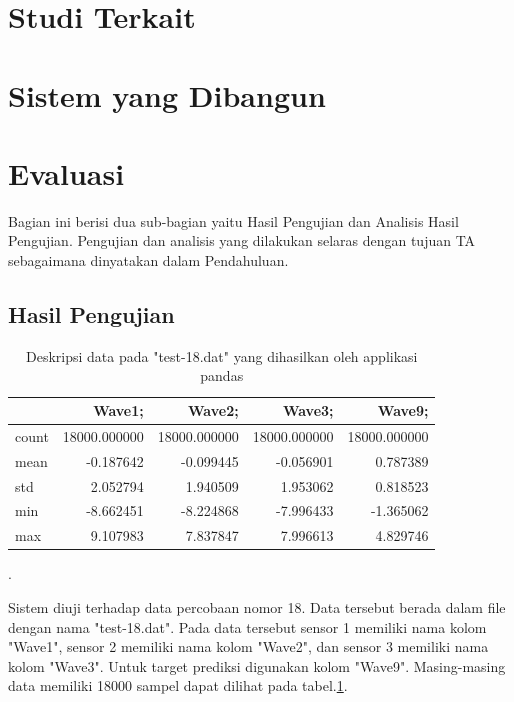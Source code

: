\section{Studi Terkait}


\section{Sistem yang Dibangun}



\section{Evaluasi}

Bagian ini berisi dua sub-bagian yaitu Hasil Pengujian dan Analisis Hasil Pengujian. Pengujian dan analisis yang dilakukan selaras dengan tujuan TA sebagaimana dinyatakan dalam Pendahuluan.

\subsection{Hasil Pengujian}
\begin{table}[h]
  \begin{center}
    \begin{tabular}{lrrrr}
      \toprule
      {} &        Wave1; &        Wave2; &        Wave3; &        Wave9; \\
      \midrule
      count &  18000.000000 &  18000.000000 &  18000.000000 &  18000.000000 \\
      mean  &     -0.187642 &     -0.099445 &     -0.056901 &      0.787389 \\
      std   &      2.052794 &      1.940509 &      1.953062 &      0.818523 \\
      min   &     -8.662451 &     -8.224868 &     -7.996433 &     -1.365062 \\
      max   &      9.107983 &      7.837847 &      7.996613 &      4.829746 \\
      \bottomrule
    \end{tabular}
  \end{center}

  \caption{Deskripsi data pada "test-18.dat" yang dihasilkan oleh applikasi pandas \cite{mckinney-proc-scipy-2010}}.
  \label{Tab:deskripsi_data}
\end{table}

Sistem diuji terhadap data percobaan nomor 18. Data tersebut berada dalam file dengan nama "test-18.dat". Pada data tersebut sensor 1 memiliki nama kolom "Wave1", sensor 2 memiliki nama kolom "Wave2", dan sensor 3 memiliki nama kolom "Wave3". Untuk target prediksi digunakan kolom "Wave9". Masing-masing data memiliki 18000 sampel dapat dilihat pada tabel.\ref{Tab:deskripsi_data}.

